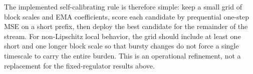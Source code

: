 The implemented self-calibrating rule is therefore simple: keep a small grid of
block scales and EMA coefficients, score each candidate by prequential one-step
MSE on a short prefix, then deploy the best candidate for the remainder of the
stream. For non-Lipschitz local behavior, the grid should include at least one
short and one longer block scale so that bursty changes do not force a single
timescale to carry the entire burden. This is an operational refinement, not a
replacement for the fixed-regulator results above.
